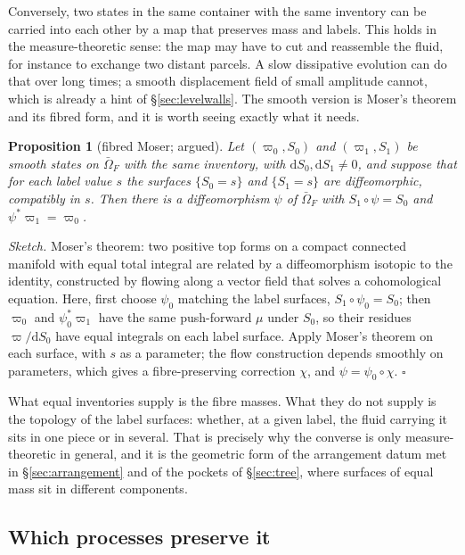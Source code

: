 \documentclass[11pt]{article}
\newtheorem{proposition}{Proposition}
\theoremstyle{definition}
\theoremstyle{remark}
\begin{document}
Conversely, two states in the same container with the same inventory
can be carried into each other by a map that preserves mass and
labels. This holds in the measure-theoretic sense: the map may have to
cut and reassemble the fluid, for instance to exchange two distant
parcels. A slow dissipative evolution can do that over long times; a
smooth displacement field of small amplitude cannot, which is already
a hint of \S\ref{sec:levelwalls}. The smooth version is Moser's
theorem and its fibred form, and it is worth seeing exactly what it
needs.

\begin{proposition}[fibred Moser; argued]
\label{prop:moser}
Let $(\varpi_0, S_0)$ and $(\varpi_1, S_1)$ be smooth states on
$\bar\Omega_F$ with the same inventory, with $\mathrm dS_0, \mathrm
dS_1 \ne 0$, and suppose that for each label value $s$ the surfaces
$\{S_0 = s\}$ and $\{S_1 = s\}$ are diffeomorphic, compatibly in $s$.
Then there is a diffeomorphism $\psi$ of $\bar\Omega_F$ with
$S_1\circ\psi = S_0$ and $\psi^*\varpi_1 = \varpi_0$.
\end{proposition}

\emph{Sketch.} Moser's theorem: two positive top forms on a compact
connected manifold with equal total integral are related by a
diffeomorphism isotopic to the identity, constructed by flowing along
a vector field that solves a cohomological equation. Here, first
choose $\psi_0$ matching the label surfaces, $S_1\circ\psi_0 = S_0$;
then $\varpi_0$ and $\psi_0^*\varpi_1$ have the same push-forward
$\mu$ under $S_0$, so their residues $\varpi/\mathrm dS_0$ have equal
integrals on each label surface. Apply Moser's theorem on each
surface, with $s$ as a parameter; the flow construction depends
smoothly on parameters, which gives a fibre-preserving correction
$\chi$, and $\psi = \psi_0\circ\chi$. \hfill$\square$

What equal inventories supply is the fibre masses. What they do not
supply is the topology of the label surfaces: whether, at a given
label, the fluid carrying it sits in one piece or in several. That is
precisely why the converse is only measure-theoretic in general, and
it is the geometric form of the arrangement datum met in
\S\ref{sec:arrangement} and of the pockets of \S\ref{sec:tree}, where
surfaces of equal mass sit in different components.

\subsection{Which processes preserve it}
\end{document}
